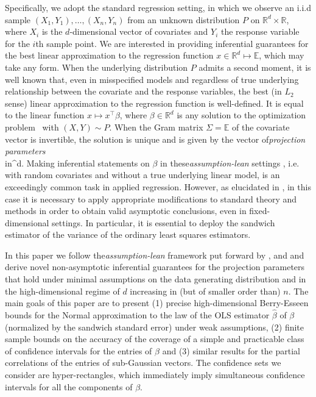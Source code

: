 \documentclass{article}
\let\hat\widehat
\begin{document}
 Specifically, we adopt the standard regression setting,  in which we observe an i.i.d sample $(X_1,Y_1),\ldots, (X_n,Y_n)$ from an unknown distribution $P$ on $\mathbb{R}^d \times \mathbb{R}$, where $X_i$ is the $d$-dimensional vector of covariates and $Y_i$ the response variable for the $i$th sample point. 
  We are interested in providing inferential guarantees for the best linear approximation to the  regression function $x \in \mathbb{R}^d \mapsto \mathbb{E}$, which may take any form.
 When the underlying  distribution $P$ admits a second moment, it is well known \citep{Buja14} that, even in misspecified models and regardless of true underlying relationship between the covariate and the response variables, the best (in $L_2$ sense) linear approximation to the regression function is well-defined. It is equal to the linear function  $x \mapsto x^\top \beta$, where $\beta \in \mathbb{R}^d$ is any solution to the optimization problem
 \,
 \]
 with $(X,Y) \sim P$.
 When the Gram matrix $\Sigma  = \mathbb{E}$ of the covariate vector is invertible, the solution is unique and is given by the vector of{\it projection parameters}
 \\in{}^d.
 \]
 Making inferential statements on $\beta$ in these{\it assumption-lean} settings \citep{Buja14}, i.e. with random covariates and without a true underlying linear model, is an exceedingly common task in applied regression. However, as elucidated in \cite{Buja14}, in this case it is necessary to apply appropriate modifications to standard theory and methods in order to obtain valid asymptotic conclusions, even in fixed-dimensional settings. In particular, it is essential to deploy the sandwich estimator \citep{White1980,Buja14} of the variance of the ordinary least squares estimators. 
 
 In this paper we follow the{\it assumption-lean} framework put forward by \cite{Buja14}, \cite{kuchibhotla2018valid} and \cite{boot} and derive novel non-asymptotic inferential guarantees for the projection parameters that hold under minimal assumptions on the data generating distribution and in the high-dimensional regime of $d$ increasing in (but of smaller order than) $n$.
 The main goals of this paper are to present (1) precise high-dimensional Berry-Esseen bounds 
 for the Normal approximation to the law of
 the OLS estimator
 $\hat\beta$ of $\beta$ (normalized by the sandwich standard error) under weak assumptions,
 (2) finite sample bounds on the
 accuracy of the coverage of a simple and practicable class of confidence intervals for the entries of
  $\beta$
 and
 (3) similar results for the 
 partial correlations of the entries of sub-Gaussian vectors.
 The confidence sets we consider are
 hyper-rectangles, which
 immediately imply
 simultaneous
 confidence intervals
 for all the components of $\beta$.
 
\end{document}
